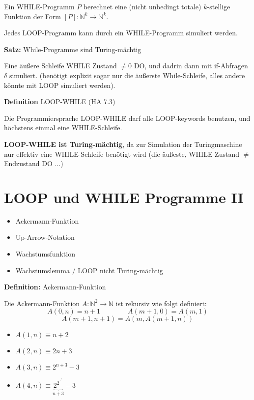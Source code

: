 \documentclass[a4paper,graphics,11pt]{article}
\begin{document}
Ein WHILE-Programm $P$ berechnet eine (nicht unbedingt totale) $k$-stellige Funktion der Form
$[P] : \mathbb{N}^k \to \mathbb{N}^k$.

Jedes LOOP-Programm kann durch ein WHILE-Programm simuliert werden.

\strut

\textbf{Satz:} While-Programme sind Turing-mächtig

Eine äußere Schleife WHILE Zustand $\neq 0$ DO, und dadrin dann mit if-Abfragen $\delta$ simuliert.
(benötigt explizit sogar nur die äußerste While-Schleife, alles andere könnte mit LOOP simuliert werden).

\strut

\textbf{Definition} LOOP-WHILE (HA 7.3)

Die Programmiersprache LOOP-WHILE darf alle LOOP-keywords benutzen, und höchstens einmal
eine WHILE-Schleife.

\textbf{LOOP-WHILE ist Turing-mächtig}, da zur Simulation der Turingmaschine nur effektiv eine WHILE-Schleife
benötigt wird (die äußeste, WHILE Zustand $\neq$ Endzustand DO ...)

\newpage

\section{LOOP und WHILE Programme II}


\begin{itemize}
    \item Ackermann-Funktion
    \item Up-Arrow-Notation
    \item Wachstumsfunktion
    \item Wachstumslemma / LOOP nicht Turing-mächtig
\end{itemize}

\textbf{Definition:} Ackermann-Funktion

Die Ackermann-Funktion $A : \mathbb{N}^2 \to \mathbb{N}$ ist rekursiv wie folgt definiert:
$$
    A(0,n) = n+1
    \qquad\qquad
    A(m+1,0) = A(m,1)
$$$$
    A(m+1,n+1) = A(m, A(m+1,n))
$$
\begin{itemize}
    \item $A(1,n) \equiv n+2$
    \item $A(2,n) \equiv 2n+3$
    \item $A(3,n) \equiv 2^{n+3}-3$
    \item $A(4,n) \equiv \underbrace{2^{2^{.^{.^{.^2}}}}}_{n+3} - 3$
\end{itemize}
\end{document}
